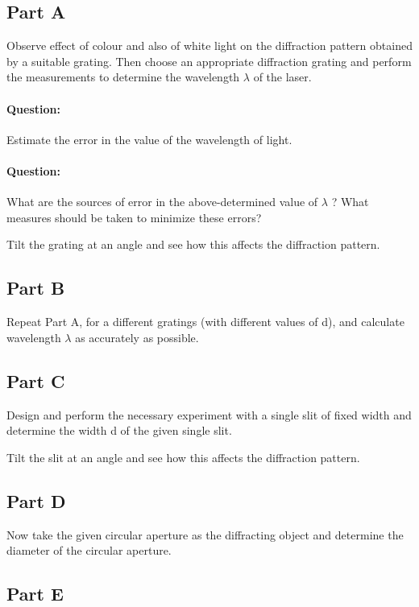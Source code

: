 \subsection*{Part A}

Observe effect of colour and also of white light on the diffraction pattern obtained by a suitable grating. Then choose an appropriate diffraction grating and perform the measurements to determine the wavelength $\lambda$ of the laser. 

\paragraph{Question:} Estimate the error in the value of the wavelength of light.

\paragraph{Question:} What are the sources of error in the above-determined value of $\lambda$ ? What measures should be taken to minimize these errors? 

Tilt the grating at an angle and see how this affects the diffraction pattern.

\subsection*{Part B}

Repeat Part A, for a different gratings (with different values of d), and calculate wavelength $\lambda$ as accurately as possible.

\subsection*{Part C}

Design and perform the necessary experiment with a single slit of fixed width and determine the width d of the given single slit.

Tilt the slit at an angle and see how this affects the diffraction pattern.

\subsection*{Part D}

Now take the given circular aperture as the diffracting object and determine the diameter of the circular aperture.

\subsection*{Part E}

